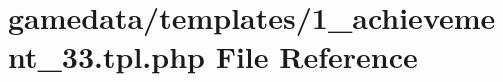 \hypertarget{1__achievement__33_8tpl_8php}{\section{gamedata/templates/1\+\_\+achievement\+\_\+33.tpl.\+php File Reference}
\label{1__achievement__33_8tpl_8php}
}
